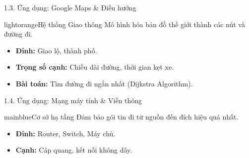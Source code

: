 \documentclass[10pt, xcolor={dvipsnames}]{beamer}
\begin{document}
\begin{frame}{1.3. Ứng dụng: Google Maps & Điều hướng}
    \begin{detailbox}{lightorange}{Hệ thống Giao thông}
        Mô hình hóa bản đồ thế giới thành các nút và đường đi.
    \end{detailbox}
    \begin{itemize}
        \item \textbf{Đỉnh:} Giao lộ, thành phố.
        \item \textbf{Trọng số cạnh:} Chiều dài đường, thời gian kẹt xe.
        \item \textbf{Bài toán:} Tìm đường đi ngắn nhất (Dijkstra Algorithm).
    \end{itemize}
\end{frame}


\begin{frame}{1.4. Ứng dụng: Mạng máy tính & Viễn thông}
    \begin{detailbox}{mainblue}{Cơ sở hạ tầng}
        Đảm bảo gói tin đi từ nguồn đến đích hiệu quả nhất.
    \end{detailbox}
    \begin{itemize}
        \item \textbf{Đỉnh:} Router, Switch, Máy chủ.
        \item \textbf{Cạnh:} Cáp quang, kết nối không dây.
    \end{itemize}
\end{frame}
\end{document}
